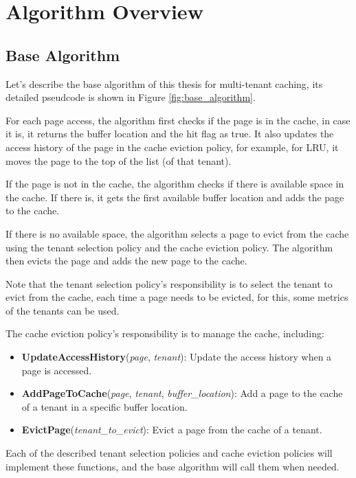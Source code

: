 \chapter{Algorithm Overview}

\section{Base Algorithm}

Let's describe the base algorithm of this thesis for multi-tenant caching, its detailed 
pseudcode is shown in Figure \ref{fig:base_algorithm}.

For each page access, the algorithm first checks if the page is in the cache,
in case it is, it returns the buffer location and the hit flag as true. It also 
updates the access history of the page in the cache eviction policy, for example,
for LRU, it moves the page to the top of the list (of that tenant).

If the page is not in the cache, the algorithm checks if there is available space
in the cache. If there is, it gets the first available buffer location and adds the
page to the cache. 

If there is no available space, the algorithm selects a page to evict from the cache 
using the tenant selection policy and the cache eviction policy. The algorithm then 
evicts the page and adds the new page to the cache.

Note that the tenant selection policy's responsibility is to select the tenant to evict
from the cache, each time a page needs to be evicted, for this, some metrics of the 
tenants can be used.

The cache eviction policy's responsibility is to manage the cache, including:
\begin{itemize}
    \item \textbf{UpdateAccessHistory}(\textit{page}, \textit{tenant}): Update the access history when a page is accessed.
    \item \textbf{AddPageToCache}(\textit{page}, \textit{tenant}, \textit{buffer\_location}): Add a page to the cache of a tenant in a specific buffer location.
    \item \textbf{EvictPage}(\textit{tenant\_to\_evict}): Evict a page from the cache of a tenant.
\end{itemize}

Each of the described tenant selection policies and cache eviction policies will implement
these functions, and the base algorithm will call them when needed.

